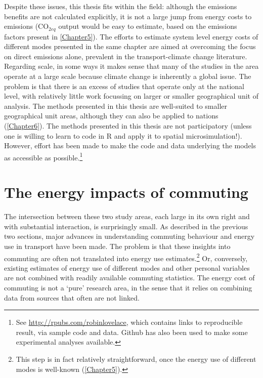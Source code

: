 \documentclass[a4paper, 11pt, twoside]{Thesis}
\begin{document}
Despite these issues, this thesis fits within the field: although the emissions
benefits are not calculated explicitly, it is not a large jump from energy
costs to emissions (CO$_{2eq}$ output
would be easy to estimate, based on the
emissions factors present in \cref{Chapter5}). The efforts to estimate
system level energy costs of different modes presented in the same chapter
are aimed at overcoming the focus on direct emissions alone, prevalent in the
transport-climate change literature. Regarding scale, in some ways it makes
sense that many of the studies in the area operate at a large scale
because climate change is inherently a global issue.
The problem is that there is an excess of studies that operate only at the
national level, with relatively little work focussing on larger or smaller geographical
unit of analysis. The methods
presented in this thesis are well-suited to smaller geographical unit areas, although
they can also be applied to nations (\cref{Chapter6}).
The methods presented in this thesis are not participatory (unless one is
willing to learn to code in R and apply it to spatial microsimulation!).
However, effort has been made to make the code and data underlying the
models as accessible as possible.\footnote{See
\url{http://rpubs.com/robinlovelace}, which contains links to
reproducible result, via sample code and data. Github has also
been used to make some experimental analyses available.
}


\section{The energy impacts of commuting} \label{sdisciplines}
The intersection between these two study areas, each large in its own
right and with substantial interaction, is surprisingly small.
As described in the previous two sections, major advances in understanding
commuting behaviour and energy use in transport have been made.
The problem is that these insights into commuting are often not
translated into energy use
estimates.\footnote{This step is in fact
relatively straightforward, once the energy use of different modes is well-known
(\cref{Chapter5}).
}
Or, conversely, existing estimates of energy use of different modes and
other personal variables are not combined with readily available
commuting statistics. The energy cost of commuting is not a
`pure' research area, in the sense that it relies on combining data from
sources that often are not linked.
\end{document}
